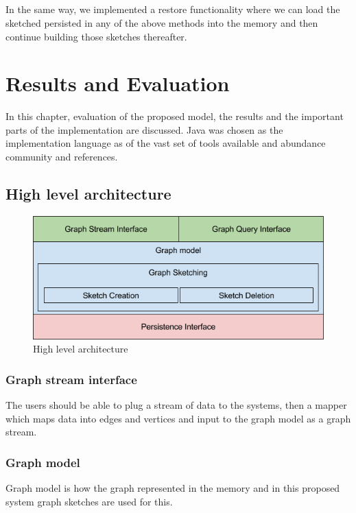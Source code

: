 \documentclass[12pt]{report}
\numberwithin{figure}{section}
\numberwithin{table}{section}
\begin{document}
\paragraph{}

In the same way, we implemented a restore functionality where we can load the sketched persisted in any of the above methods into the memory and then continue building those sketches thereafter.

\chapter{Results and Evaluation}
In this chapter, evaluation of the proposed model, the results and the important parts of the implementation are discussed. Java was chosen as the implementation language as of the vast set of tools available and abundance community and references.

\section{High level architecture}

\begin{figure}[H]
\centering
\includegraphics[scale=0.7]{images/image01}
\caption{High level architecture}
\end{figure}

\subsection*{Graph stream interface}
The users should be able to plug a stream of data to the systems, then a mapper which maps data into edges and vertices and input to the graph model as a graph stream.

\subsection*{Graph model}
Graph model is how the graph represented in the memory and in this proposed system graph sketches are used for this. 
\end{document}

